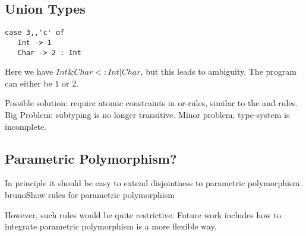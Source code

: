 \subsection{Union Types}

\begin{lstlisting}
case 3,,'c' of
   Int -> 1
   Char -> 2 : Int
\end{lstlisting}

Here we have $Int \& Char <: Int | Char$, but this leads to ambiguity. The program can either 
be $1$ or $2$. 

Possible solution: require atomic constraints in or-rules, similar to the and-rules. 
Big Problem: subtyping is no longer transitive. Minor problem, type-system is incomplete.

\subsection{Parametric Polymorphism?}

In principle it should be easy to extend disjointness to parametric polymorphism. 
bruno{Show rules for parametric polymorphism}

However, such rules would be quite restrictive. Future work includes how to integrate 
parametric polymorphism is a more flexible way.  
